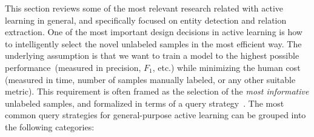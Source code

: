 This section reviews some of the most relevant research related with active learning in general, and specifically focused on entity detection and relation extraction.
One of the most important design decisions in active learning is how to intelligently select the novel unlabeled samples in the most efficient way. The underlying assumption is that we want to train a
model to the highest possible performance~(measured in precision, $F_1$, etc.) while minimizing the human cost (measured in time, number of samples manually labeled, or any other suitable metric).
This requirement is often framed as the selection of the \textit{most informative} unlabeled samples, and formalized in terms of a query strategy~\cite{survey}.
The most common query strategies for general-purpose active learning can be grouped into the following categories:

